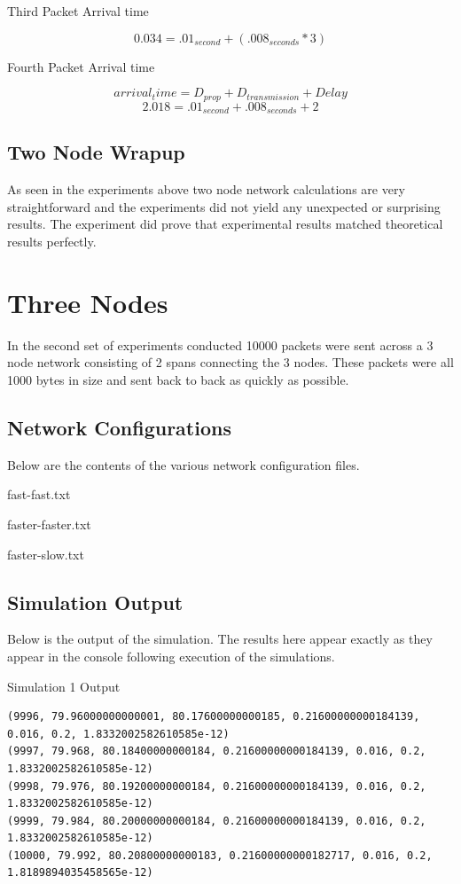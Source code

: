 \documentclass[12pt]{article}
\begin{document}
\centerline{Third Packet Arrival time}
\begin{equation}
  0.034 = .01_{second} + (.008_{seconds} * 3)
\end{equation}

\centerline{Fourth Packet Arrival time}
\begin{equation}
arrival_time = D_{prop} + D_{transmission} + Delay
\end{equation}
\begin{equation}
  2.018 = .01_{second} + .008_{seconds} + 2
\end{equation}

\subsection{Two Node Wrapup}
As seen in the experiments above two node network calculations are very straightforward and the experiments did not yield any unexpected or surprising results. The experiment did prove that experimental results matched theoretical results perfectly.



\section{Three Nodes}
In the second set of experiments conducted 10000 packets were sent across a 3 node network consisting of 2 spans connecting the 3 nodes. These packets were all 1000 bytes in size and sent back to back as quickly as possible.

\subsection{Network Configurations}
Below are the contents of the various network configuration files.\\

\centerline{fast-fast.txt}


\centerline{faster-faster.txt}


\centerline{faster-slow.txt}


\subsection{Simulation Output}
Below is the output of the simulation. The results here appear exactly as they appear in the console following execution of the simulations.\\
\centerline{Simulation 1 Output}
\begin{verbatim}
(9996, 79.96000000000001, 80.17600000000185, 0.21600000000184139, 0.016, 0.2, 1.8332002582610585e-12)
(9997, 79.968, 80.18400000000184, 0.21600000000184139, 0.016, 0.2, 1.8332002582610585e-12)
(9998, 79.976, 80.19200000000184, 0.21600000000184139, 0.016, 0.2, 1.8332002582610585e-12)
(9999, 79.984, 80.20000000000184, 0.21600000000184139, 0.016, 0.2, 1.8332002582610585e-12)
(10000, 79.992, 80.20800000000183, 0.21600000000182717, 0.016, 0.2, 1.8189894035458565e-12)
\end{verbatim}
\end{document}
